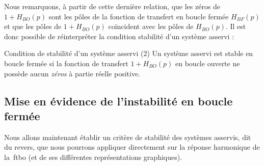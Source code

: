 Nous remarquons, à partir de cette dernière relation,
que les zéros de $1+H_{BO}(p)$ sont les pôles de la fonction de 
transfert en boucle fermée $H_{BF}(p)$ et que les pôles 
de $1+H_{BO}(p)$ co\"incident avec 
les pôles de $H_{BO}(p)$. Il est donc possible de 
réinterpréter la condition stabilité d'un système asservi :
\begin{criteria}{Condition de stabilité d'un système asservi (2)}
    Un système asservi est stable en boucle fermée si la fonction 
    de transfert $1+H_{BO}(p)$ en boucle ouverte ne possède aucun 
    \emph{zéros} à partie réelle positive.
    \label{critere2}
\end{criteria}
\subsection{Mise en évidence de l'instabilité en boucle fermée}
Nous allons maintenant établir un critère de stabilité des 
systèmes asservis, dit du revers, que nous pourrons appliquer directement 
sur la réponse harmonique de la~\gls{ftbo} (et de ses différentes 
représentations graphiques).


